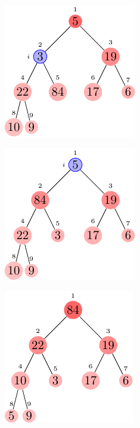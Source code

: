 \begin{description}
\begin{ex}
\begin{figure}[H]
\begin{subfigure}[t]{.45\textwidth}
          \caption{}\label{fig:6_3-1_2}
        \end{subfigure}
        \begin{subfigure}[t]{.45\textwidth}
          \centering
          \includegraphics[scale=1.4]{img/6_3-1/6_3-1_3}
          \caption{}\label{fig:6_3-1_3}
        \end{subfigure}
        \begin{subfigure}[t]{.45\textwidth}
          \centering
          \includegraphics[scale=1.4]{img/6_3-1/6_3-1_4}
          \caption{}\label{fig:6_3-1_4}
        \end{subfigure}
        \begin{subfigure}[t]{.45\textwidth}
          \centering
          \includegraphics[scale=1.4]{img/6_3-1/6_3-1_5}
          \caption{}\label{fig:6_3-1_5}
        \end{subfigure}

\end{figure}
\end{ex}
\end{description}
